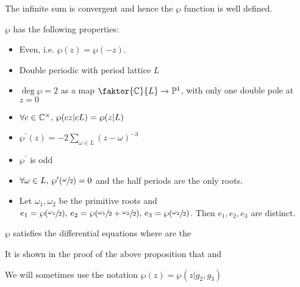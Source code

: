 \documentclass{article}
\begin{document}
\begin{prop}
	The infinite sum is convergent and hence the $\wp$ function is well defined.
\end{prop}

\begin{prop}
	$\wp$ has the following properties:
	\begin{itemize}
		\item Even, i.e. $\wp(z) = \wp(-z)$.
		\item Double periodic with period lattice $L$
		\item $\deg \wp = 2$ as a map $\faktor{\mbb{C}}{L} \to \mbb{P}^1$, with only one double pole at $z=0$
		\item $\forall c \in \mathbb{C}^\times, \, \wp(cz | cL) = \wp(z | L)$
		\item $\wp^\prime(z) = -2\sum_{\omega \in L} (z-\omega)^{-3}$
		\item $\wp^\prime$ is odd
		\item $\forall \omega \in L, \, \wp^\prime(\sfrac{\omega}{2}) =0$ and the half periods are the only roots. 
		\item Let $\omega_1, \omega_2$ be the primitive roots and $e_1 = \wp(\sfrac{\omega_1}{2}), \, e_2 = \wp(\sfrac{\omega_1}{2} + \sfrac{\omega_2}{2}), \, e_3 = \wp(\sfrac{\omega_2}{2})$. Then $e_1, e_2, e_3$ are distinct.
	\end{itemize}
\end{prop}

\begin{prop}
	$\wp$ satisfies the differential equations 
	where 
	are the 
\end{prop}

\begin{remark}
	It is shown in the proof of the above proposition that 
	and 
\end{remark}

\begin{remark}
	We will sometimes use the notation $\wp(z) = \wp(z | g_2, g_3)$
\end{remark}
\end{document}
